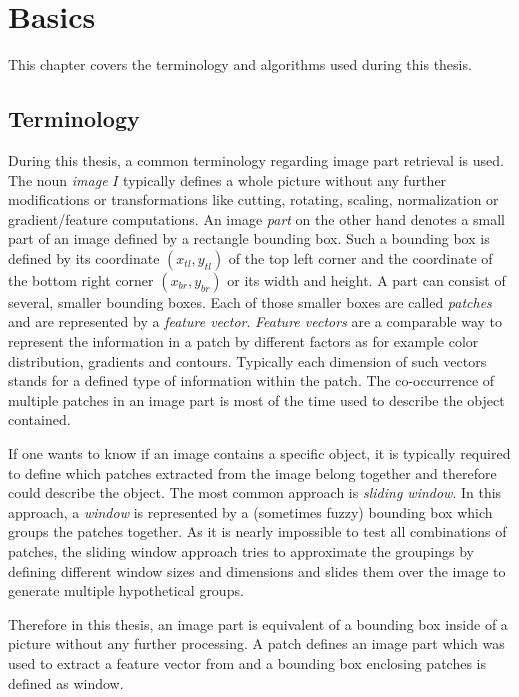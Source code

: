 \chapter{Basics}

This chapter covers the terminology and algorithms used during this thesis. 

\section{Terminology}
\label{sec:basic:terminology}

During this thesis, a common terminology regarding image part retrieval is used. The noun \textit{image} $I$ typically defines a whole picture without any further modifications or transformations like cutting, rotating, scaling, normalization or gradient/feature computations. An image \textit{part} on the other hand denotes a small part of an image defined by a rectangle bounding box. Such a bounding box is defined by its coordinate $(x_{tl},y_{tl})$ of the top left corner and the coordinate of the bottom right corner $(x_{br},y_{br})$ or its width and height. A part can consist of several, smaller bounding boxes. Each of those smaller boxes are called \textit{patches} and are represented by a \textit{feature vector}. \textit{Feature vectors} are a comparable way to represent the information in a patch by different factors as for example color distribution, gradients and contours. Typically each dimension of such vectors stands for a defined type of information within the patch. The co-occurrence of multiple patches in an image part is most of the time used to describe the object contained.

If one wants to know if an image contains a specific object, it is typically required to define which patches extracted from the image belong together and therefore could describe the object. The most common approach is \textit{sliding window}. In this approach, a \textit{window} is represented by a (sometimes fuzzy) bounding box which groups the patches together. As it is nearly impossible to test all combinations of patches, the sliding window approach tries to approximate the groupings by defining different window sizes and dimensions and slides them over the image to generate multiple hypothetical groups.

Therefore in this thesis, an image part is equivalent of a bounding box inside of a picture without any further processing. A patch defines an image part which was used to extract a feature vector from and a bounding box enclosing patches is defined as window.
\bigskip

